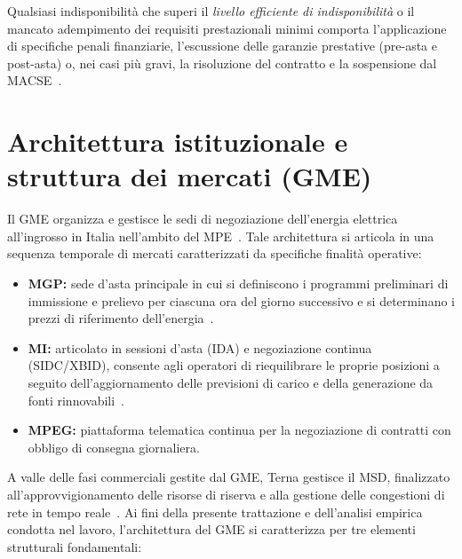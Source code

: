Qualsiasi indisponibilità che superi il \textit{livello efficiente di indisponibilità} o il mancato adempimento dei requisiti prestazionali minimi comporta l'applicazione di specifiche penali finanziarie, l'escussione delle garanzie prestative (pre-asta e post-asta) o, nei casi più gravi, la risoluzione del contratto e la sospensione dal \ac{MACSE}~\cite{terna_disciplina}.



\section{Architettura istituzionale e struttura dei mercati (GME)}
\label{sec:architettura_gme}

Il \acf{GME} organizza e gestisce le sedi di negoziazione dell'energia elettrica all'ingrosso in Italia nell'ambito del \acf{MPE}~\cite{gme_disciplina}. Tale architettura si articola in una sequenza temporale di mercati caratterizzati da specifiche finalità operative:

\begin{itemize}
    \item \textbf{\acf{MGP}:} sede d'asta principale in cui si definiscono i programmi preliminari di immissione e prelievo per ciascuna ora del giorno successivo e si determinano i prezzi di riferimento dell'energia~\cite{gme_disciplina}.
    \item \textbf{\acf{MI}:} articolato in sessioni d'asta (IDA) e negoziazione continua (SIDC/XBID), consente agli operatori di riequilibrare le proprie posizioni a seguito dell'aggiornamento delle previsioni di carico e della generazione da fonti rinnovabili~\cite{arera_2023_relazione}.
    \item \textbf{\acf{MPEG}:} piattaforma telematica continua per la negoziazione di contratti con obbligo di consegna giornaliera.
\end{itemize}

A valle delle fasi commerciali gestite dal \ac{GME}, Terna gestisce il \acf{MSD}, finalizzato all'approvvigionamento delle risorse di riserva e alla gestione delle congestioni di rete in tempo reale~\cite{dlgs_79_1999}. Ai fini della presente trattazione e dell'analisi empirica condotta nel lavoro, l'architettura del \ac{GME} si caratterizza per tre elementi strutturali fondamentali:

